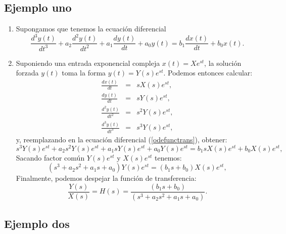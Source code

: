 \subsection{Ejemplo uno}

\begin{enumerate}
	\item Supongamos que tenemos la ecuaci\'{o}n diferencial
	\begin{equation}
		\frac{d^{3}y\left( t\right) }{dt^{3}}+
		a_{2} \frac{d^{2}y\left( t\right) }{dt^{2}}+
		a_{1} \frac{dy\left( t\right) }{dt}+
		a_{0} y\left( t\right) =
		b_{1} \frac{dx\left( t\right) }{dt} +
		b_{0} x\left( t\right).
		\label{odefunctrans}
	\end{equation}
	
	\item Suponiendo una entrada exponencial compleja $x(t) = X e^{s t}$, la soluci\'{o}n forzada $y(t)$ toma la forma $y(t) = Y(s) e^{s t}$. Podemos entonces calcular:
	\begin{eqnarray}
		\frac{dx\left( t\right) }{dt}           &=& s X(s) e^{s t},                \\
		\frac{dy\left( t\right) }{dt}           &=& s Y(s) e^{s t},                \\
		\frac{d^{2}y\left( t\right) }{dt^{2}}   &=& s^{2} Y(s) e^{s t},            \\
		\frac{d^{3}y\left( t\right) }{dt^{3}}   &=& s^{3} Y(s) e^{s t},
	\end{eqnarray}
	y, reemplazando en la ecuaci\'{o}n diferencial (\ref{odefunctrans}), obtener:
	\begin{equation}
		s^{3} Y(s) e^{s t} + a_{2} s^{2} Y(s) e^{s t} + a_{1} s Y(s) e^{s t} + a_{0} Y(s) e^{s t} = 
		b_{1} s X(s) e^{s t} + b_{0} X(s) e^{s t},
	\end{equation}
	Sacando factor com\'{u}n $Y(s) e^{s t}$ y $X(s) e^{s t}$ tenemos:
	\begin{equation}
		\left( s^{3} + a_{2} s^{2} + a_{1} s  + a_{0} \right) Y(s)
		e^{s t} = \left( b_{1} s + b_{0} \right) X(s) e^{s t},
	\end{equation}
	Finalmente, podemos despejar la funci\'{o}n de transferencia:
	\begin{equation}
		\frac{Y(s)}{X(s)} = H(s) =  
		\frac{\left( b_{1} s + b_{0} \right)}{\left( s^{3} + a_{2} s^{2}  + a_{1} s  + a_{0} \right)}.
	\end{equation}
\end{enumerate}

\subsection{Ejemplo dos}

